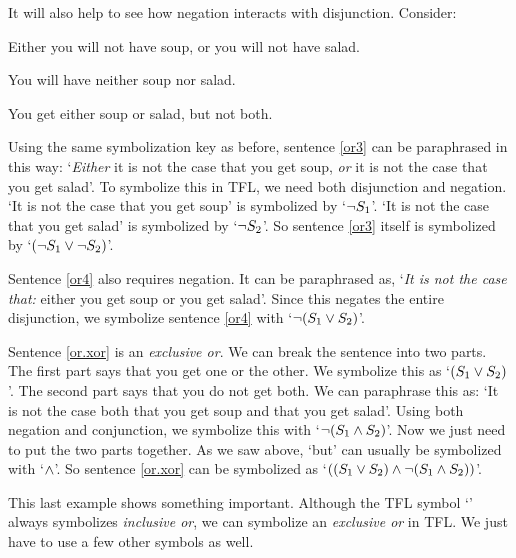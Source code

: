 It will also help to see how negation interacts with disjunction. Consider: 
	\begin{earg}
		\item[\ex{or3}] Either you will not have soup, or you will not have salad.
		\item[\ex{or4}] You will have neither soup nor salad.
		\item[\ex{or.xor}] You get either soup or salad, but not both.
	\end{earg}
Using the same symbolization key as before, sentence \ref{or3} can be paraphrased in this way: `\emph{Either} it is not the case that you get soup, \emph{or} it is not the case that you get salad'. To symbolize this in TFL, we need both disjunction and negation. `It is not the case that you get soup' is symbolized by `$\neg S_1$'. `It is not the case that you get salad' is symbolized by `$\neg S_2$'. So sentence \ref{or3} itself is symbolized by `$(\neg S_1 \vee \neg S_2)$'.

Sentence \ref{or4} also requires negation. It can be paraphrased as, `\emph{It is not the case that:} either you get soup or you get salad'. Since this negates the entire disjunction, we symbolize sentence \ref{or4} with `$\neg (S_1 \vee S_2)$'.

Sentence \ref{or.xor} is an \emph{exclusive or}. We can break the sentence into two parts. The first part says that you get one or the other. We symbolize this as `$(S_1 \vee S_2)$'. The second part says that you do not get both. We can paraphrase this as: `It is not the case both that you get soup and that you get salad'. Using both negation and conjunction, we symbolize this with `$\neg(S_1 \wedge S_2)$'. Now we just need to put the two parts together. As we saw above, `but' can usually be symbolized with `$\wedge$'. So sentence \ref{or.xor} can be symbolized as `$((S_1 \vee S_2) \wedge \neg(S_1 \wedge S_2))$'.

This last example shows something important. Although the TFL symbol `\eor' always symbolizes \emph{inclusive or}, we can symbolize an \emph{exclusive or} in {TFL}. We just have to use a few other symbols as well.

